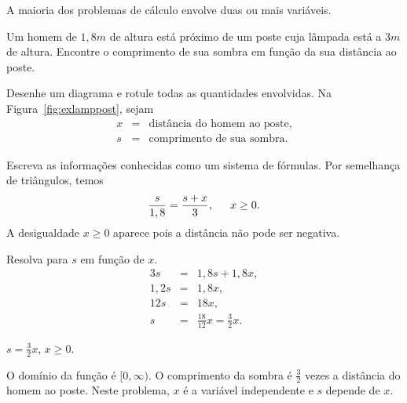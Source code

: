 A maioria dos problemas de cálculo envolve duas ou mais variáveis.

\begin{example}
Um homem de $1,8\si{m}$ de altura está próximo de um poste cuja lâmpada
está a $3\si{m}$ de altura. Encontre o comprimento de sua sombra em função
da sua distância ao poste.
\begin{stepanalysis}
\item Desenhe um diagrama e rotule todas as quantidades envolvidas. Na
      Figura~\ref{fig:exlamppost}, sejam
      \begin{eqnarray*}
        x & = & \text{distância do homem ao poste,} \\
        s & = & \text{comprimento de sua sombra}.
      \end{eqnarray*}
\item Escreva as informações conhecidas como um sistema de fórmulas. Por
      semelhança de triângulos, temos
      $$
        \frac{s}{1,8} = \frac{s + x}{3}, \hspace{1.5em} x \ge 0.
      $$
      A desigualdade $x \ge 0$ aparece pois a distância não pode ser
      negativa.
\item Resolva para $s$ em função de $x$.
      \begin{eqnarray*}
        3s & = & 1,8s + 1,8x, \\
        1,2s & = & 1,8x, \\
         12s & = & 18x, \\
        s & = & \frac{18}{12}x = \frac{3}{2}x.
      \end{eqnarray*}
\end{stepanalysis}
\begin{interpretsolution} $s = \frac{3}{2}x$, \hspace{1.5ex} $x \ge 0$.

  O domínio da função é $[0, \infty)$. O comprimento da sombra é
  $\frac{3}{2}$ vezes a distância do homem ao poste. Neste problema, $x$
  é a variável independente e $s$ depende de $x$.
\end{interpretsolution}
\end{example}

